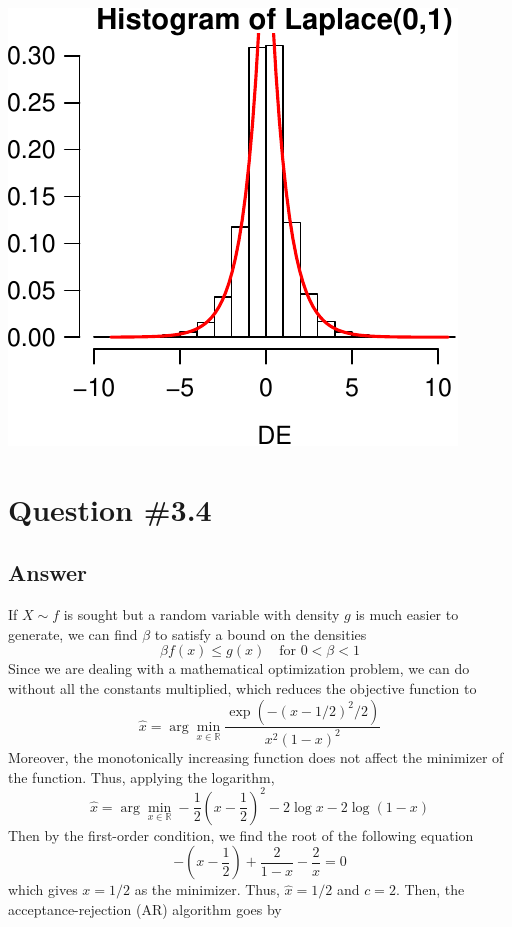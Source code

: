 \documentclass[11pt,]{article}
\begin{document}
\begin{center}\includegraphics{Hw1_Solution_files/figure-latex/plotExp-1} \end{center}

\section{Question \#3.4}\label{question-3.4}

\subsection{Answer}\label{answer-3}

If \(X \sim f\) is sought but a random variable with density \(g\) is
much easier to generate, we can find \(\beta\) to satisfy a bound on the
densities \[
\beta f(x)\leq g(x)\quad \text{for }0<\beta<1
\] Since we are dealing with a mathematical optimization problem, we can
do without all the constants multiplied, which reduces the objective
function to \[
\hat{x} =\arg\min_{x\in \mathbb{R}} \dfrac{\exp\left(-(x-1/2)^{2}/2\right)}{x^{2}(1-x)^{2}}
\] Moreover, the monotonically increasing function does not affect the
minimizer of the function. Thus, applying the logarithm, \[
\hat{x} = \arg\min_{x\in \mathbb{R}} -\dfrac{1}{2}\left(x-\dfrac{1}{2}\right)^{2} - 2 \log x - 2 \log(1-x)
\] Then by the first-order condition, we find the root of the following
equation \[
-\left(x-\dfrac{1}{2}\right)+\dfrac{2}{1-x}-\dfrac{2}{x} = 0
\] which gives \(x = 1/2\) as the minimizer. Thus, \(\hat{x}=1/2\) and
\(c = 2\). Then, the acceptance-rejection (AR) algorithm goes by
\end{document}
